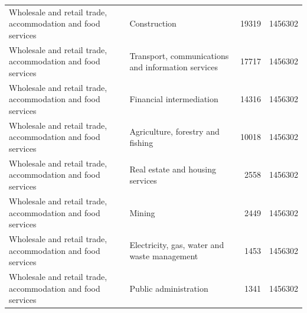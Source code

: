 \begin{longtable}{llrr}
Wholesale and retail trade, accommodation and food services & Construction & 19319 & 1456302 \\
Wholesale and retail trade, accommodation and food services & Transport, communications and information services & 17717 & 1456302 \\
Wholesale and retail trade, accommodation and food services & Financial intermediation & 14316 & 1456302 \\
Wholesale and retail trade, accommodation and food services & Agriculture, forestry and fishing & 10018 & 1456302 \\
Wholesale and retail trade, accommodation and food services & Real estate and housing services & 2558 & 1456302 \\
Wholesale and retail trade, accommodation and food services & Mining & 2449 & 1456302 \\
Wholesale and retail trade, accommodation and food services & Electricity, gas, water and waste management & 1453 & 1456302 \\
Wholesale and retail trade, accommodation and food services & Public administration & 1341 & 1456302 \\
\end{longtable}
